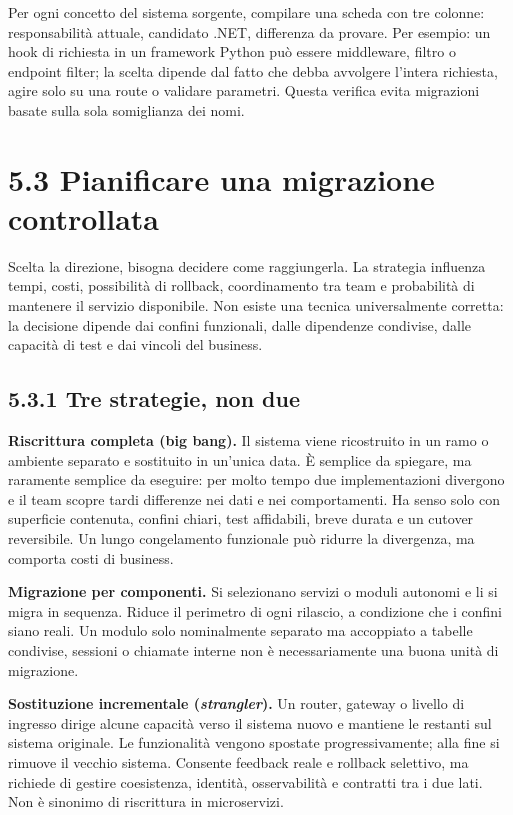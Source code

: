 \documentclass[
  italian,
  10pt,
]{book}
\begin{document}
Per ogni concetto del sistema sorgente, compilare una scheda con tre
colonne: responsabilità attuale, candidato .NET, differenza da provare.
Per esempio: un hook di richiesta in un framework Python può essere
middleware, filtro o endpoint filter; la scelta dipende dal fatto che
debba avvolgere l'intera richiesta, agire solo su una route o validare
parametri. Questa verifica evita migrazioni basate sulla sola
somiglianza dei nomi.

\section{5.3 Pianificare una migrazione
controllata}\label{pianificare-una-migrazione-controllata}

Scelta la direzione, bisogna decidere come raggiungerla. La strategia
influenza tempi, costi, possibilità di rollback, coordinamento tra team
e probabilità di mantenere il servizio disponibile. Non esiste una
tecnica universalmente corretta: la decisione dipende dai confini
funzionali, dalle dipendenze condivise, dalle capacità di test e dai
vincoli del business.

\subsection{5.3.1 Tre strategie, non due}\label{tre-strategie-non-due}

\textbf{Riscrittura completa (big bang).} Il sistema viene ricostruito
in un ramo o ambiente separato e sostituito in un'unica data. È semplice
da spiegare, ma raramente semplice da eseguire: per molto tempo due
implementazioni divergono e il team scopre tardi differenze nei dati e
nei comportamenti. Ha senso solo con superficie contenuta, confini
chiari, test affidabili, breve durata e un cutover reversibile. Un lungo
congelamento funzionale può ridurre la divergenza, ma comporta costi di
business.

\textbf{Migrazione per componenti.} Si selezionano servizi o moduli
autonomi e li si migra in sequenza. Riduce il perimetro di ogni
rilascio, a condizione che i confini siano reali. Un modulo solo
nominalmente separato ma accoppiato a tabelle condivise, sessioni o
chiamate interne non è necessariamente una buona unità di migrazione.

\textbf{Sostituzione incrementale (\emph{strangler}).} Un router,
gateway o livello di ingresso dirige alcune capacità verso il sistema
nuovo e mantiene le restanti sul sistema originale. Le funzionalità
vengono spostate progressivamente; alla fine si rimuove il vecchio
sistema. Consente feedback reale e rollback selettivo, ma richiede di
gestire coesistenza, identità, osservabilità e contratti tra i due lati.
Non è sinonimo di riscrittura in microservizi.
\end{document}
